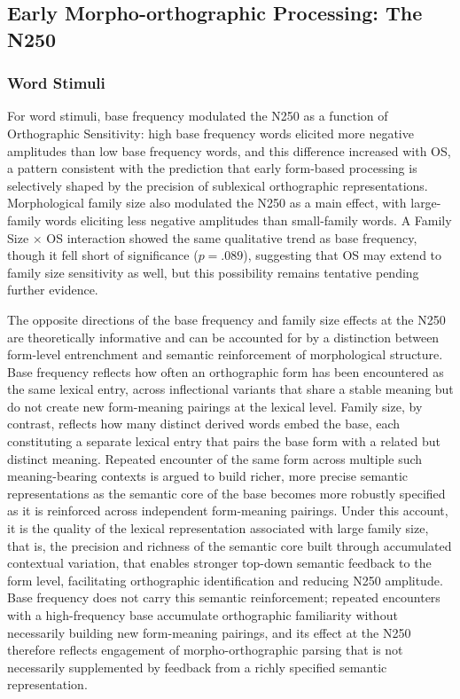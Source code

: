 \documentclass[utf8]{FrontiersinHarvard} %
\begin{document}
	\subsection{Early Morpho-orthographic Processing: The N250}
	
	\subsubsection{Word Stimuli}
	
	For word stimuli, base frequency modulated the N250 as a function of Orthographic Sensitivity: high base frequency words elicited more negative amplitudes than low base frequency words, and this difference increased with OS, a pattern consistent with the prediction that early form-based processing is selectively shaped by the precision of sublexical orthographic representations. Morphological family size also modulated the N250 as a main effect, with large-family words eliciting less negative amplitudes than small-family words. A Family Size $\times$ OS interaction showed the same qualitative trend as base frequency, though it fell short of significance ($p = .089$), suggesting that OS may extend to family size sensitivity as well, but this possibility remains tentative pending further evidence.
	
	The opposite directions of the base frequency and family size effects at the N250 are theoretically informative and can be accounted for by a distinction between form-level entrenchment and semantic reinforcement of morphological structure. Base frequency reflects how often an orthographic form has been encountered as the same lexical entry, across inflectional variants that share a stable meaning but do not create new form-meaning pairings at the lexical level. Family size, by contrast, reflects how many distinct derived words embed the base, each constituting a separate lexical entry that pairs the base form with a related but distinct meaning. Repeated encounter of the same form across multiple such meaning-bearing contexts is argued to build richer, more precise semantic representations \citep{bolgerContextVariationDefinitions2008, liLearningNovelComplex2026} as the semantic core of the base becomes more robustly specified as it is reinforced across independent form-meaning pairings. Under this account, it is the quality of the lexical representation associated with large family size, that is, the precision and richness of the semantic core built through accumulated contextual variation, that enables stronger top-down semantic feedback to the form level, facilitating orthographic identification and reducing N250 amplitude. Base frequency does not carry this semantic reinforcement; repeated encounters with a high-frequency base accumulate orthographic familiarity without necessarily building new form-meaning pairings, and its effect at the N250 therefore reflects engagement of morpho-orthographic parsing that is not necessarily supplemented by feedback from a richly specified semantic representation.
	
\end{document}
